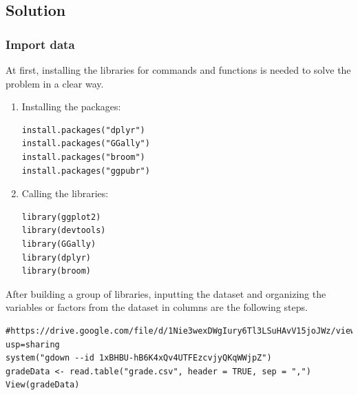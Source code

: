 \documentclass[a4paper]{article}
\begin{document}

\vspace{0.5cm}
\subsection{Solution}
\vspace{0.4cm}
\subsubsection{Import data}
\vspace{0.4cm}
At first, installing the libraries for commands and functions is needed to solve the problem in a clear way.
\begin{enumerate}
    \item Installing the packages: 
    \begin{mdframed}[leftline=false,rightline=false,backgroundcolor=magenta!10,nobreak=true]
        \begin{verbatim}
install.packages("dplyr")
install.packages("GGally")
install.packages("broom")
install.packages("ggpubr")
        \end{verbatim}
    \end{mdframed}
    \item Calling the libraries:
    \begin{mdframed}[leftline=false,rightline=false,backgroundcolor=magenta!10,nobreak=true]
        \begin{verbatim}
library(ggplot2)
library(devtools)
library(GGally)
library(dplyr)
library(broom)
        \end{verbatim}
    \end{mdframed}
\end{enumerate}
After building a group of libraries, inputting the dataset and organizing the variables or factors from the dataset in columns are the following steps.
\begin{mdframed}[leftline=false,rightline=false,backgroundcolor=magenta!10,nobreak=true]
    \begin{verbatim}
#https://drive.google.com/file/d/1Nie3wexDWgIury6Tl3LSuHAvV15joJWz/view?usp=sharing
system("gdown --id 1xBHBU-hB6K4xQv4UTFEzcvjyQKqWWjpZ")
gradeData <- read.table("grade.csv", header = TRUE, sep = ",")
View(gradeData)
    \end{verbatim}
\end{mdframed}
\end{document}
